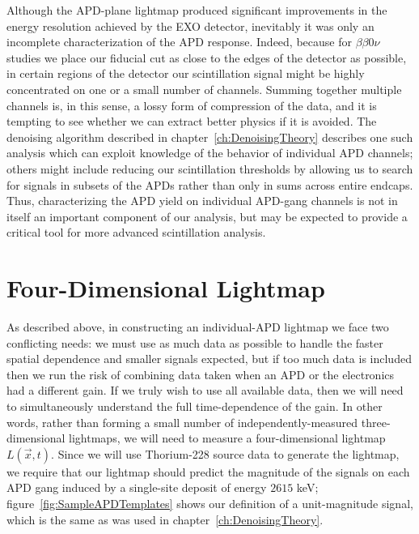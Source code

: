 Although the APD-plane lightmap produced significant improvements in the energy resolution achieved by the EXO detector, inevitably it was only an incomplete characterization of the APD response.  Indeed, because for $\beta\beta0\nu$ studies we place our fiducial cut as close to the edges of the detector as possible, in certain regions of the detector our scintillation signal might be highly concentrated on one or a small number of channels.  Summing together multiple channels is, in this sense, a lossy form of compression of the data, and it is tempting to see whether we can extract better physics if it is avoided.  The denoising algorithm described in chapter~\ref{ch:DenoisingTheory} describes one such analysis which can exploit knowledge of the behavior of individual APD channels; others might include reducing our scintillation thresholds by allowing us to search for signals in subsets of the APDs rather than only in sums across entire endcaps.  Thus, characterizing the APD yield on individual APD-gang channels is not in itself an important component of our analysis, but may be expected to provide a critical tool for more advanced scintillation analysis.

\section{Four-Dimensional Lightmap}

As described above, in constructing an individual-APD lightmap we face two conflicting needs: we must use as much data as possible to handle the faster spatial dependence and smaller signals expected, but if too much data is included then we run the risk of combining data taken when an APD or the electronics had a different gain.  If we truly wish to use all available data, then we will need to simultaneously understand the full time-dependence of the gain.  In other words, rather than forming a small number of independently-measured three-dimensional lightmaps, we will need to measure a four-dimensional lightmap $L(\vec{x},t)$.  Since we will use Thorium-228 source data to generate the lightmap, we require that our lightmap should predict the magnitude of the signals on each APD gang induced by a single-site deposit of energy $2615$ keV; figure~\ref{fig:SampleAPDTemplates} shows our definition of a unit-magnitude signal, which is the same as was used in chapter~\ref{ch:DenoisingTheory}.


